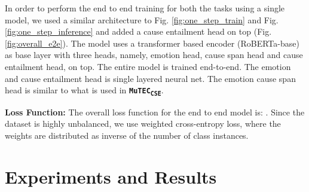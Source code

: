 \documentclass{article}
\newcommand{\subone}{\textbf{\texttt{MuTEC\textsubscript{CSE}}}}
\begin{document}
In order to perform the end to end training for both the tasks using a single model, we used a similar architecture to Fig. \ref{fig:one_step_train} and Fig. \ref{fig:one_step_inference} and added a cause entailment head on top (Fig. \ref{fig:overall_e2e}). The model uses a transformer based encoder (RoBERTa-base) as base layer with three heads, namely, emotion head, cause span head and cause entailment head, on top. The entire model is trained end-to-end. The emotion and cause entailment head is single layered neural net. The emotion cause span head is similar to what is used in \subone. 

\noindent\textbf{Loss Function:} The overall loss function for the end to end model is: . Since the dataset is highly unbalanced, we use weighted cross-entropy loss, where the weights are distributed as inverse of the number of class instances. \section{Experiments and Results} \label{sec:experiments}
\vspace{-3mm}
\end{document}

